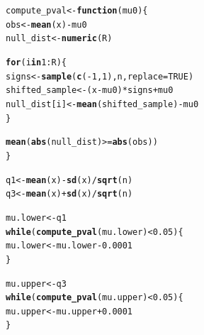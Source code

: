 \documentclass{article}\usepackage[]{graphicx}\usepackage[]{xcolor}
\makeatletter
\newcommand{\hlnum}[1]{\textcolor[rgb]{0.686,0.059,0.569}{#1}}%
\newcommand{\hlopt}[1]{\textcolor[rgb]{0,0,0}{#1}}%
\newcommand{\hldef}[1]{\textcolor[rgb]{0.345,0.345,0.345}{#1}}%
\newcommand{\hlkwa}[1]{\textcolor[rgb]{0.161,0.373,0.58}{\textbf{#1}}}%
\newcommand{\hlkwb}[1]{\textcolor[rgb]{0.69,0.353,0.396}{#1}}%
\newcommand{\hlkwc}[1]{\textcolor[rgb]{0.333,0.667,0.333}{#1}}%
\newcommand{\hlkwd}[1]{\textcolor[rgb]{0.737,0.353,0.396}{\textbf{#1}}}%
\newenvironment{kframe}{%
 \def\at@end@of@kframe{}%
 \ifinner\ifhmode%
  \def\at@end@of@kframe{\end{minipage}}%
  \begin{minipage}{\columnwidth}%
 \fi\fi%
 \def\FrameCommand##1{\hskip\@totalleftmargin \hskip-\fboxsep
 \colorbox{shadecolor}{##1}\hskip-\fboxsep
     \hskip-\linewidth \hskip-\@totalleftmargin \hskip\columnwidth}%
 \MakeFramed {\advance\hsize-\width
   \@totalleftmargin\z@ \linewidth\hsize
   \@setminipage}}%
 {\par\unskip\endMakeFramed%
 \at@end@of@kframe}
\newenvironment{knitrout}{}{} %
\makeatother
\begin{document}
\begin{enumerate}
\begin{enumerate}
\begin{knitrout}
\begin{kframe}
\begin{alltt}
\hldef{compute_pval} \hlkwb{<-} \hlkwa{function}\hldef{(}\hlkwc{mu0}\hldef{) \{}
\hldef{obs} \hlkwb{<-} \hlkwd{mean}\hldef{(x)} \hlopt{-} \hldef{mu0}
\hldef{null_dist} \hlkwb{<-} \hlkwd{numeric}\hldef{(R)}

\hlkwa{for} \hldef{(i} \hlkwa{in} \hlnum{1}\hlopt{:}\hldef{R) \{}
  \hldef{signs} \hlkwb{<-} \hlkwd{sample}\hldef{(}\hlkwd{c}\hldef{(}\hlopt{-}\hlnum{1}\hldef{,} \hlnum{1}\hldef{), n,} \hlkwc{replace} \hldef{=} \hlnum{TRUE}\hldef{)}
  \hldef{shifted_sample} \hlkwb{<-} \hldef{(x} \hlopt{-} \hldef{mu0)} \hlopt{*} \hldef{signs} \hlopt{+} \hldef{mu0}
  \hldef{null_dist[i]} \hlkwb{<-} \hlkwd{mean}\hldef{(shifted_sample)} \hlopt{-} \hldef{mu0}
\hldef{\}}

\hlkwd{mean}\hldef{(}\hlkwd{abs}\hldef{(null_dist)} \hlopt{>=} \hlkwd{abs}\hldef{(obs))}
\hldef{\}}

\hldef{q1} \hlkwb{<-} \hlkwd{mean}\hldef{(x)} \hlopt{-} \hlkwd{sd}\hldef{(x)} \hlopt{/} \hlkwd{sqrt}\hldef{(n)}
\hldef{q3} \hlkwb{<-} \hlkwd{mean}\hldef{(x)} \hlopt{+} \hlkwd{sd}\hldef{(x)} \hlopt{/} \hlkwd{sqrt}\hldef{(n)}

\hldef{mu.lower} \hlkwb{<-} \hldef{q1}
\hlkwa{while} \hldef{(}\hlkwd{compute_pval}\hldef{(mu.lower)} \hlopt{<} \hlnum{0.05}\hldef{) \{}
\hldef{mu.lower} \hlkwb{<-} \hldef{mu.lower} \hlopt{-} \hlnum{0.0001}
\hldef{\}}

\hldef{mu.upper} \hlkwb{<-} \hldef{q3}
\hlkwa{while} \hldef{(}\hlkwd{compute_pval}\hldef{(mu.upper)} \hlopt{<} \hlnum{0.05}\hldef{) \{}
\hldef{mu.upper} \hlkwb{<-} \hldef{mu.upper} \hlopt{+} \hlnum{0.0001}
\hldef{\}}


\end{alltt}
\end{kframe}
\end{knitrout}
\end{enumerate}
\end{enumerate}
\end{document}
